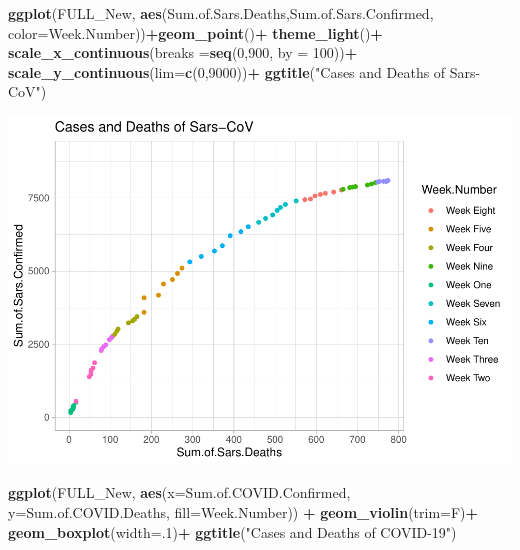 \documentclass[
]{article}
\newenvironment{Shaded}{\begin{snugshade}}{\end{snugshade}}
\newcommand{\DataTypeTok}[1]{\textcolor[rgb]{0.13,0.29,0.53}{#1}}
\newcommand{\DecValTok}[1]{\textcolor[rgb]{0.00,0.00,0.81}{#1}}
\newcommand{\KeywordTok}[1]{\textcolor[rgb]{0.13,0.29,0.53}{\textbf{#1}}}
\newcommand{\NormalTok}[1]{#1}
\newcommand{\OperatorTok}[1]{\textcolor[rgb]{0.81,0.36,0.00}{\textbf{#1}}}
\newcommand{\StringTok}[1]{\textcolor[rgb]{0.31,0.60,0.02}{#1}}
\begin{document}
\begin{Shaded}
\begin{Highlighting}[]
\KeywordTok{ggplot}\NormalTok{(FULL_New, }\KeywordTok{aes}\NormalTok{(Sum.of.Sars.Deaths,Sum.of.Sars.Confirmed, }\DataTypeTok{color=}\NormalTok{Week.Number))}\OperatorTok{+}\KeywordTok{geom_point}\NormalTok{()}\OperatorTok{+}
\StringTok{  }\KeywordTok{theme_light}\NormalTok{()}\OperatorTok{+}
\StringTok{  }\KeywordTok{scale_x_continuous}\NormalTok{(}\DataTypeTok{breaks =}\KeywordTok{seq}\NormalTok{(}\DecValTok{0}\NormalTok{,}\DecValTok{900}\NormalTok{, }\DataTypeTok{by =} \DecValTok{100}\NormalTok{))}\OperatorTok{+}
\StringTok{  }\KeywordTok{scale_y_continuous}\NormalTok{(}\DataTypeTok{lim=}\KeywordTok{c}\NormalTok{(}\DecValTok{0}\NormalTok{,}\DecValTok{9000}\NormalTok{))}\OperatorTok{+}\StringTok{ }
\StringTok{  }\KeywordTok{ggtitle}\NormalTok{(}\StringTok{"Cases and Deaths of Sars-CoV"}\NormalTok{)}
\end{Highlighting}
\end{Shaded}

\begin{center}\includegraphics{project1_files/figure-latex/unnamed-chunk-4-2} \end{center}

\begin{Shaded}
\begin{Highlighting}[]
\KeywordTok{ggplot}\NormalTok{(FULL_New, }\KeywordTok{aes}\NormalTok{(}\DataTypeTok{x=}\NormalTok{Sum.of.COVID.Confirmed, }\DataTypeTok{y=}\NormalTok{Sum.of.COVID.Deaths, }\DataTypeTok{fill=}\NormalTok{Week.Number)) }\OperatorTok{+}
\StringTok{  }\KeywordTok{geom_violin}\NormalTok{(}\DataTypeTok{trim=}\NormalTok{F)}\OperatorTok{+}
\StringTok{  }\KeywordTok{geom_boxplot}\NormalTok{(}\DataTypeTok{width=}\NormalTok{.}\DecValTok{1}\NormalTok{)}\OperatorTok{+}
\StringTok{  }\KeywordTok{ggtitle}\NormalTok{(}\StringTok{"Cases and Deaths of COVID-19"}\NormalTok{)}
\end{Highlighting}
\end{Shaded}
\end{document}
